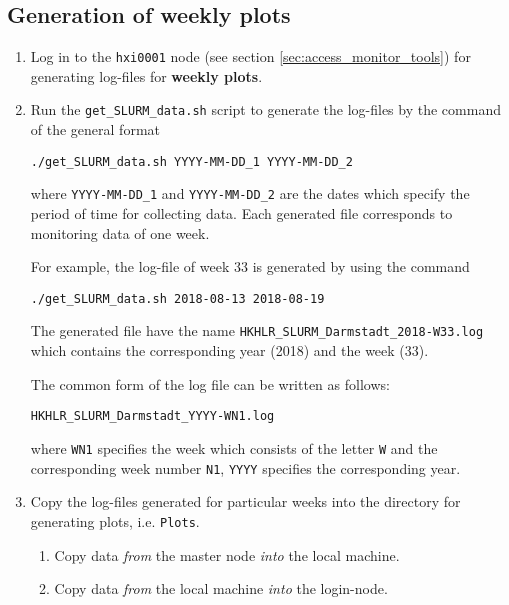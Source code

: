 \documentclass[12pt,a4paper,onecolumn]{article}
\begin{document}
\subsection{Generation of weekly plots}
\label{sec:weekly_plots_generation}


\begin{enumerate}

\item Log in to the \lstinline{hxi0001} node (see section \ref{sec:access_monitor_tools}) for generating log-files for \textbf{weekly plots}.

\item Run the \lstinline{get_SLURM_data.sh} script to generate the log-files by the command of the general format 
\begin{lstlisting}
./get_SLURM_data.sh YYYY-MM-DD_1 YYYY-MM-DD_2
\end{lstlisting}
where \lstinline{YYYY-MM-DD_1} and \lstinline{YYYY-MM-DD_2} are the dates which specify the period of time for collecting data.
Each generated file corresponds to monitoring data of one week.

For example, the log-file of week 33 is generated by using the command
\begin{lstlisting}
./get_SLURM_data.sh 2018-08-13 2018-08-19
\end{lstlisting}
The generated file have the name \lstinline{HKHLR_SLURM_Darmstadt_2018-W33.log} which contains the corresponding year (2018) and the week (33).

The common form of the log file can be written as follows:
\begin{lstlisting}
HKHLR_SLURM_Darmstadt_YYYY-WN1.log
\end{lstlisting}
where \lstinline{WN1} specifies the week which consists of the letter \lstinline{W} and the corresponding week number \lstinline{N1}, \lstinline{YYYY} specifies the corresponding year.

\item Copy the log-files generated for particular weeks into the directory for generating plots, i.e. \lstinline{Plots}.

\begin{enumerate}
\item Copy data \textit{from} the master node \textit{into} the local machine.
\item Copy data \textit{from} the local machine \textit{into} the login-node.
\end{enumerate}


\end{enumerate}
\end{document}
